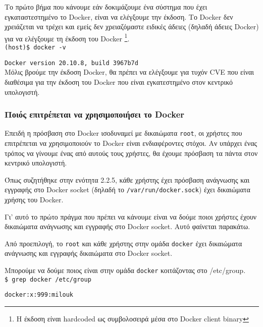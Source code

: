 Το πρώτο βήμα που κάνουμε εάν δοκιμάζουμε ένα σύστημα που έχει εγκαταστεστημένο
το \textlatin{Docker}, είναι να ελέγξουμε την έκδοση. Το \textlatin{Docker} δεν
χρειάζεται να τρέχει και εμείς δεν χρειαζόμαστε ειδικές άδειες (δηλαδή άδειες
\textlatin{Docker}) για να ελέγξουμε τη έκδοση του \textlatin{Docker}
\footnote{Η έκδοση είναι \textlatin{hardcoded} ως συμβολοσειρά μέσα στο
\textlatin{Docker client binary}}. \\

\texttt{\textlatin{(host)\$ docker -v}}

\texttt{\textlatin{Docker version 20.10.8, build 3967b7d}} \\

Μόλις βρούμε την έκδοση Docker, θα πρέπει να ελέγξουμε για τυχόν \textlatin{CVE}
που είναι διαθέσιμα για την έκδοση του \textlatin{Docker} που είναι
εγκατεστημένο στον κεντρικό υπολογιστή.

\subsubsection{Ποιός επιτρέπεται να χρησιμοποιήσει το \textlatin{Docker}}

Επειδή η πρόσβαση στο \textlatin{Docker} ισοδυναμεί με δικαιώματα
\texttt{\textlatin{root}}, οι χρήστες που επιτρέπεται να χρησιμοποιούν το
\textlatin{Docker} είναι ενδιαφέροντες στόχοι. Αν υπάρχει ένας τρόπος να γίνουμε
ένας από αυτούς τους χρήστες, θα έχουμε πρόσβαση τα πάντα στον κεντρικό
υπολογιστή.

Όπως συζητήθηκε στην ενότητα 2.2.5, κάθε χρήστης έχει πρόσβαση ανάγνωσης και
εγγραφής στο \textlatin{Docker socket} (δηλαδή το
\texttt{\textlatin{/var/run/docker.sock}}) έχει δικαιώματα χρήσης του
\textlatin{Docker}.

Γι' αυτό το πρώτο πράγμα που πρέπει να κάνουμε είναι να δούμε ποιοι χρήστες
έχουν δικαιώματα ανάγνωσης και εγγραφής στο \textlatin{Docker socket}. Αυτό
φαίνεται παρακάτω.

Από προεπιλογή, το \texttt{\textlatin{root}} και κάθε χρήστης στην ομάδα
\texttt{\textlatin{docker}} έχει δικαιώματα ανάγνωσης και εγγραφής δικαιώματα
στο \textlatin{Docker socket}.

Μπορούμε να δούμε ποιος είναι στην ομάδα \texttt{\textlatin{docker}} κοιτάζοντας
στο \textlatin{/etc/group}. \\

\texttt{\textlatin{\$ grep docker /etc/group}}

\texttt{\textlatin{docker:x:999:milouk}} \\

